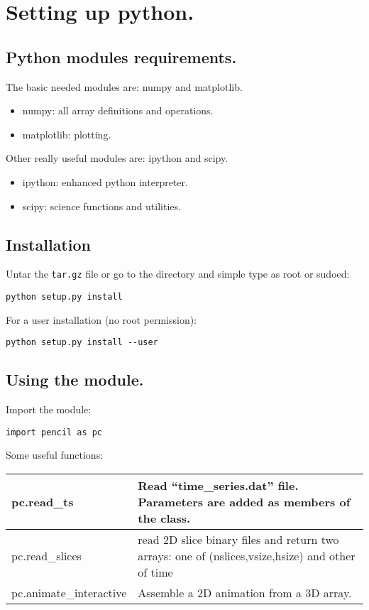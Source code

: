 \documentclass[a4paper,12pt]{article}
\begin{document}
\section{Setting up python.}
\subsection{Python modules requirements.}
The basic needed modules are: numpy and matplotlib.
\begin{itemize}
 \item numpy: all array definitions and operations.
  \item matplotlib: plotting.
\end{itemize}

Other really useful modules are: ipython and scipy.

\begin{itemize}
 \item ipython: enhanced python interpreter.
  \item scipy: science functions and utilities.
\end{itemize}


\subsection{Installation}
Untar the \texttt{tar.gz} file or go to the directory and simple type as root or sudoed:
\begin{verbatim}
python setup.py install
\end{verbatim}
For a user installation (no root permission):
\begin{verbatim}
python setup.py install --user
\end{verbatim}

\subsection{Using the module.}
Import the module:
\begin{verbatim}
import pencil as pc
\end{verbatim}
Some useful functions:
\begin{center}
\begin{tabular}{|l|l|}\hline
pc.read\_ts & Read ``time\_series.dat'' file. Parameters are added as members of the class. \\\hline
pc.read\_slices & read 2D slice binary files and return two arrays: one of (nslices,vsize,hsize) and other of time\\\hline
pc.animate\_interactive &  Assemble a 2D animation from a 3D array. \\\hline
\end{tabular}
\end{center}
\end{document}

